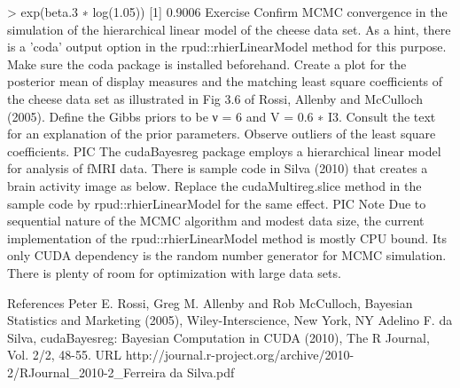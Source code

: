 > exp(beta.3 ∗ log(1.05)) 
[1] 0.9006
Exercise
Confirm MCMC convergence in the simulation of the hierarchical linear model of the cheese data set. As a hint, there is a ’coda’ output option in the rpud::rhierLinearModel method for this purpose. Make sure the coda package is installed beforehand.
Create a plot for the posterior mean of display measures and the matching least square coefficients of the cheese data set as illustrated in Fig 3.6 of Rossi, Allenby and McCulloch (2005). Define the Gibbs priors to be ν = 6 and V = 0.6 ∗ I3. Consult the text for an explanation of the prior parameters. Observe outliers of the least square coefficients.
PIC
The cudaBayesreg package employs a hierarchical linear model for analysis of fMRI data. There is sample code in Silva (2010) that creates a brain activity image as below. Replace the cudaMultireg.slice method in the sample code by rpud::rhierLinearModel for the same effect.
PIC
Note
Due to sequential nature of the MCMC algorithm and modest data size, the current implementation of the rpud::rhierLinearModel method is mostly CPU bound. Its only CUDA dependency is the random number generator for MCMC simulation. There is plenty of room for optimization with large data sets.

References
Peter E. Rossi, Greg M. Allenby and Rob McCulloch, Bayesian Statistics and Marketing (2005), Wiley-Interscience, New York, NY
Adelino F. da Silva, cudaBayesreg: Bayesian Computation in CUDA (2010), The R Journal, Vol. 2/2, 48-55. URL http://journal.r-project.org/archive/2010-2/RJournal_2010-2_Ferreira da Silva.pdf

